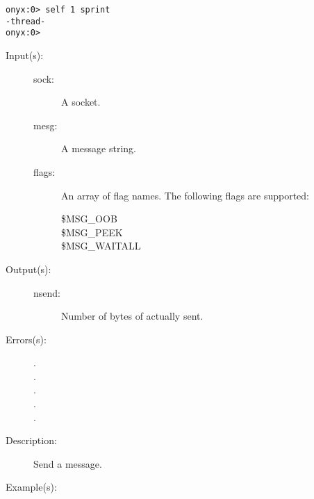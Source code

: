 \begin{description}
\begin{description}
\begin{verbatim}
onyx:0> self 1 sprint
-thread-
onyx:0>
		\end{verbatim}
	\end{description}
\label{systemdict:send}
\item[{\onyxop{sock mesg flags}{send}{nsend}}: ]
\item[{\onyxop{sock mesg}{send}{nsend}}: ]
	\begin{description}\item[]
	\item[Input(s): ]
		\begin{description}\item[]
		\item[sock: ]
			A socket.
		\item[mesg: ]
			A message string.
		\item[flags: ]
			An array of flag names.  The following flags are
			supported:
			\begin{description}%
			\item[\$MSG\_OOB]
			\item[\$MSG\_PEEK]
			\item[\$MSG\_WAITALL]
			\end{description}
		\end{description}
	\item[Output(s): ]
		\begin{description}\item[]
		\item[nsend: ]
			Number of bytes of  actually sent.
		\end{description}
	\item[Errors(s): ]
		\begin{description}\item[]
		\item[.]
		\item[.]
		\item[.]
		\item[.]
		\item[.]
		\end{description}
	\item[Description: ]
		Send a message.
	\item[Example(s): ]\begin{verbatim}


\end{verbatim}
\end{description}
\end{description}
